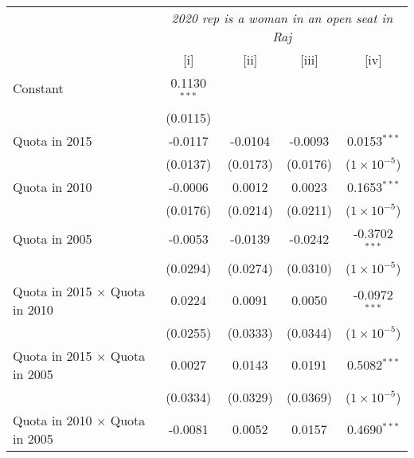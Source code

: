 
\begingroup
\centering
\begin{tabular}{lcccc}
   \toprule
    & \multicolumn{4}{c}{\textit{2020 rep is a woman in an open seat in Raj}}\\
                                                                   & [i]            & [ii]          & [iii]         & [iv]\\  
   \midrule 
   Constant                                                        & 0.1130$^{***}$ &               &               &   \\   
                                                                   & (0.0115)       &               &               &   \\   
   Quota in 2015                                                   & -0.0117        & -0.0104       & -0.0093       & 0.0153$^{***}$\\   
                                                                   & (0.0137)       & (0.0173)      & (0.0176)      & ($1\times 10^{-5}$)\\    
   Quota in 2010                                                   & -0.0006        & 0.0012        & 0.0023        & 0.1653$^{***}$\\   
                                                                   & (0.0176)       & (0.0214)      & (0.0211)      & ($1\times 10^{-5}$)\\    
   Quota in 2005                                                   & -0.0053        & -0.0139       & -0.0242       & -0.3702$^{***}$\\   
                                                                   & (0.0294)       & (0.0274)      & (0.0310)      & ($1\times 10^{-5}$)\\    
   Quota in 2015 $\times $ Quota in 2010                           & 0.0224         & 0.0091        & 0.0050        & -0.0972$^{***}$\\   
                                                                   & (0.0255)       & (0.0333)      & (0.0344)      & ($1\times 10^{-5}$)\\    
   Quota in 2015 $\times $ Quota in 2005                           & 0.0027         & 0.0143        & 0.0191        & 0.5082$^{***}$\\   
                                                                   & (0.0334)       & (0.0329)      & (0.0369)      & ($1\times 10^{-5}$)\\    
   Quota in 2010 $\times $ Quota in 2005                           & -0.0081        & 0.0052        & 0.0157        & 0.4690$^{***}$\\   

\end{tabular}

